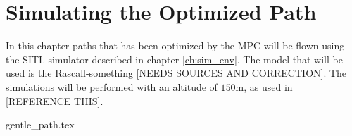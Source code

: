 \chapter{Simulating the Optimized Path}

In this chapter paths that has been optimized by the MPC will be flown using the SITL simulator described in chapter \ref{ch:sim_env}. The model that will be used is the Rascall-something [NEEDS SOURCES AND CORRECTION]. The simulations will be performed with an altitude of $150$m, as used in [REFERENCE THIS].


{gentle_path.tex}